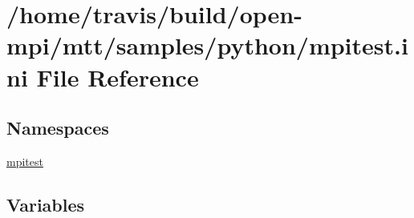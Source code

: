 \hypertarget{mpitest_8ini}{\section{/home/travis/build/open-\/mpi/mtt/samples/python/mpitest.ini File Reference}
\label{mpitest_8ini}
}
\subsection*{Namespaces}
\begin{DoxyCompactItemize}
\item 
\hyperlink{namespacempitest}{mpitest}
\end{DoxyCompactItemize}
\subsection*{Variables}
